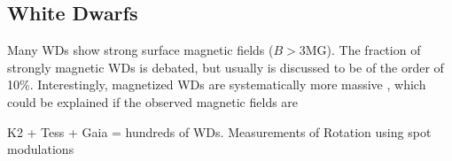 {\color{red} \subsection{White Dwarfs}}
Many WDs show strong surface magnetic fields ($B>$3MG). The fraction of strongly magnetic WDs is debated, but usually is discussed to be of the order of 10\%. Interestingly, magnetized WDs are systematically more massive \cite{Ferrario_2015}, which could be explained if the observed magnetic fields are   

K2 + Tess + Gaia = hundreds of WDs. Measurements of Rotation using spot modulations